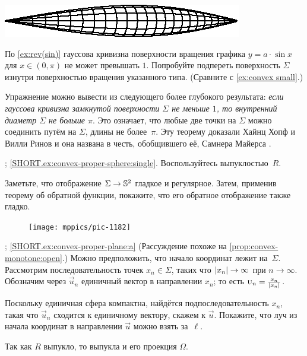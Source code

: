 \begin{multicols}{2}
\begin{Figure}
\vskip-0mm
\centering
\includegraphics{asy/sin-mini}
\vskip-0mm
\end{Figure}

По \ref{ex:rev(sin)} гауссова кривизна поверхности вращения графика $y=a\cdot \sin x$ для $x\in(0,\pi)$ не может превышать $1$.
Попробуйте подпереть поверхность $\Sigma$ изнутри поверхностью вращения указанного типа.
(Сравните с \ref{ex:convex small}.)

Упражнение можно вывести из следующего более глубокого результата: \textit{если гауссова кривизна замкнутой поверхности $\Sigma$ не меньше $1$,
то внутренний диаметр $\Sigma$ не больше $\pi$}.
Это означает, что любые две точки на $\Sigma$ можно соединить путём на $\Sigma$, длины не более~$\pi$.
Эту теорему доказали Хайнц Хопф и Вилли Ринов \cite{hopf-rinow} и она названа в честь, обобщившего её, Самнера Майерса \cite{myers}.

\parbf{\ref{ex:convex-proper-sphere}}; \ref{SHORT.ex:convex-proper-sphere:single}.
Воспользуйтесь выпуклостью~$R$.

Заметьте, что отображение $\Sigma\z\to\mathbb{S}^2$ гладкое и регулярное.
Затем, применив теорему об обратной функции, покажите, что его обратное отображение также гладко.

\begin{figure}
\vskip-4mm
\centering
\texttt{[image: mppics/pic-1182]}
\vskip-3mm
\end{figure}

\parbf{\ref{ex:convex-proper-plane}}; \ref{SHORT.ex:convex-proper-plane:a}
(Рассуждение похоже на \ref{prop:convex-monotone:open}.)
Можно предположить, что начало координат лежит на~$\Sigma$.
Рассмотрим последовательность точек $x_n\in \Sigma$, таких что $|x_n|\z\to \infty$ при $n\to \infty$.
Обозначим через $\vec u_n$ единичный вектор в направлении $x_n$; то есть $\vec u_n\z=\tfrac{x_n}{|x_n|}$.

Поскольку единичная сфера компактна, найдётся подпоследовательность $x_n$, такая что $\vec u_n$ сходится к единичному вектору, скажем к $\vec u$.
Покажите, что луч из начала координат в направлении $\vec u$ можно взять за~$\ell$.

Так как $R$ выпукло, то выпукла и его проекция $\Omega$.


\end{multicols}
